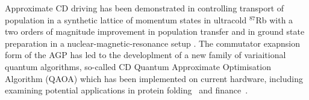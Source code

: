 Approximate CD driving has been demonstrated in controlling transport of population in a synthetic lattice of momentum states in ultracold ${}^{87}$Rb with a two orders of magnitude improvement in population transfer \cite{meier2020counterdiabatic} and in ground state preparation in a nuclear-magnetic-resonance setup \cite{zhou2020experimental}. The commutator exapnsion form of the AGP has led to the developlment of a new family of variaitional quantum algorithms, so-called CD Quantum Approximate Optimisation Algorithm (QAOA) \cite{wurtz2022counterdiabaticity,Chandarana2022digitized} which has been implemented on current hardware, including examining potential applications in protein folding~\cite{Chandarana2023digitized} and finance~\cite{Hegade2022portfolio}.